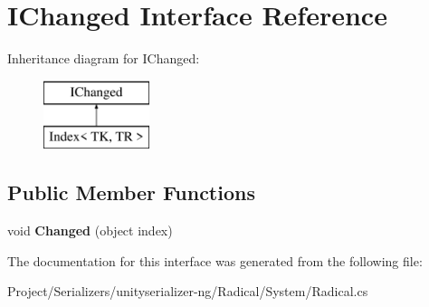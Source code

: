 \hypertarget{interface_i_changed}{}\section{I\+Changed Interface Reference}
\label{interface_i_changed}
Inheritance diagram for I\+Changed\+:\begin{figure}[H]
\begin{center}
\leavevmode
\includegraphics[height=2.000000cm]{interface_i_changed}
\end{center}
\end{figure}
\subsection*{Public Member Functions}
\begin{DoxyCompactItemize}
\item 
\mbox{\label{interface_i_changed_a7d4904db56316c1cc3aa98b112dd4ca8}} 
void {\bfseries Changed} (object index)
\end{DoxyCompactItemize}


The documentation for this interface was generated from the following file\+:\begin{DoxyCompactItemize}
\item 
Project/\+Serializers/unityserializer-\/ng/\+Radical/\+System/Radical.\+cs\end{DoxyCompactItemize}
